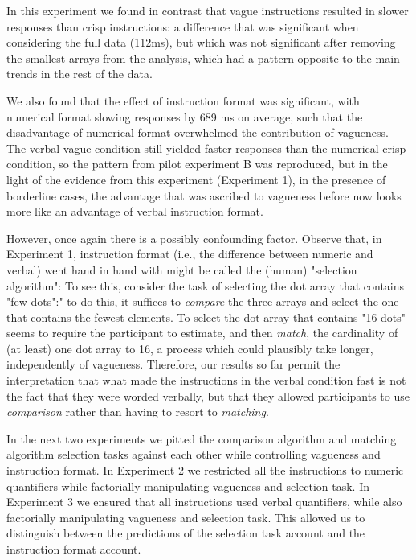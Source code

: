In this experiment we found in contrast that vague instructions resulted in slower responses than crisp instructions: a difference that was significant when considering the full data (112ms), but which was not significant after removing the smallest arrays from the analysis, which had a pattern opposite to the main trends in the rest of the data.

We also found that the effect of instruction format was significant, with numerical format slowing responses by 689 ms on average, such that the disadvantage of numerical format overwhelmed the contribution of vagueness. The verbal vague condition still yielded faster responses than the numerical crisp condition, so the pattern from pilot experiment B was reproduced, but in the light of the evidence from this experiment (Experiment 1), in the presence of borderline cases, the advantage that was ascribed to vagueness before now looks more like an advantage of verbal instruction format.

However, once again there is a possibly confounding factor. Observe that, in Experiment 1, instruction format (i.e., the difference between numeric and verbal) went hand in hand with might be called the (human) "selection algorithm": To see this, consider the task of selecting the dot array that contains "few dots":" to do this, it suffices to \emph{compare} the three arrays and select the one that contains the fewest elements.  To select the dot array that contains "16 dots" seems to require the participant to estimate, and then \emph{match}, the cardinality of (at least) one dot array to 16, a process which could plausibly take longer, independently of vagueness. Therefore, our results so far permit the interpretation that what made the instructions in the verbal condition fast is not the fact that they were worded verbally, but that they allowed participants to use \emph{comparison} rather than having to resort to \emph{matching}.

In the next two experiments we pitted the comparison algorithm and matching algorithm selection tasks against each other while controlling vagueness and instruction format. In Experiment 2 we restricted all the instructions to numeric quantifiers while factorially manipulating vagueness and selection task. In Experiment 3 we ensured that all instructions used verbal quantifiers, while also factorially manipulating vagueness and selection task. This allowed us to distinguish between the predictions of the selection task account and the instruction format account. 

